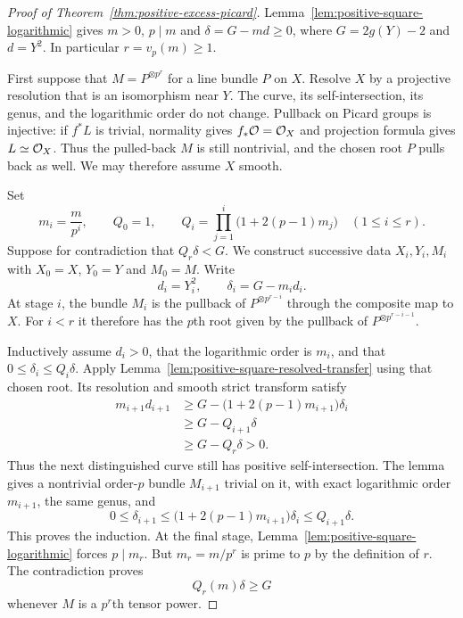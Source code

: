 \begin{proof}[Proof of Theorem~\ref{thm:positive-excess-picard}]
Lemma~\ref{lem:positive-square-logarithmic} gives $m>0$, $p\mid m$
and $\delta=G-md\geq0$, where $G=2g(Y)-2$ and $d=Y^2$.
In particular $r=v_p(m)\geq1$.

First suppose that $M=P^{\otimes p^r}$ for a line bundle
$P$ on $X$. Resolve $X$ by a projective resolution that is an
isomorphism near $Y$. The curve, its self-intersection, its genus,
and the logarithmic order do not change. Pullback on Picard groups
is injective: if $f^*L$ is trivial, normality gives
$f_*\mathcal O=\mathcal O_X$ and projection formula gives $L\simeq\mathcal O_X$.
Thus the pulled-back $M$ is still nontrivial, and the chosen root
$P$ pulls back as well. We may therefore assume $X$ smooth.

Set
\[
 m_i=\frac{m}{p^i},\qquad
 Q_0=1,\qquad
 Q_i=\prod_{j=1}^{i}\bigl(1+2(p-1)m_j\bigr)
 \quad(1\leq i\leq r).
\]
Suppose for contradiction that $Q_r\delta<G$.
We construct successive data $X_i,Y_i,M_i$ with
$X_0=X$, $Y_0=Y$ and $M_0=M$. Write
\[
 d_i=Y_i^2,\qquad \delta_i=G-m_i d_i.
\]
At stage $i$, the bundle $M_i$ is the pullback of
$P^{\otimes p^{r-i}}$ through the composite map to $X$.
For $i<r$ it therefore has the $p$th root given by the pullback
of $P^{\otimes p^{r-i-1}}$.

Inductively assume $d_i>0$, that the logarithmic order is $m_i$,
and that $0\leq\delta_i\leq Q_i\delta$.
Apply Lemma~\ref{lem:positive-square-resolved-transfer} using that
chosen root. Its resolution and smooth strict transform satisfy
\begin{align*}
 m_{i+1}d_{i+1}
 &\geq G-\bigl(1+2(p-1)m_{i+1}\bigr)\delta_i\\
 &\geq G-Q_{i+1}\delta\\
 &\geq G-Q_r\delta>0.
\end{align*}
Thus the next distinguished curve still has positive
self-intersection. The lemma gives a nontrivial order-$p$ bundle
$M_{i+1}$ trivial on it, with exact logarithmic order $m_{i+1}$,
the same genus, and
\[
 0\leq\delta_{i+1}
 \leq\bigl(1+2(p-1)m_{i+1}\bigr)\delta_i
 \leq Q_{i+1}\delta.
\]
This proves the induction. At the final stage,
Lemma~\ref{lem:positive-square-logarithmic} forces $p\mid m_r$.
But $m_r=m/p^r$ is prime to $p$ by the definition of $r$.
The contradiction proves
\[
 Q_r(m)\delta\geq G
\]
whenever $M$ is a $p^r$th tensor power.


\end{proof}
